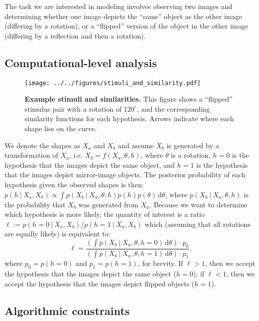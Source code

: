 \documentclass[10pt,letterpaper]{article}
\newcommand{\hi}[0]{h=0}
\newcommand{\hf}[0]{h=1}
\newcommand{\dif}[0]{\,\mathrm{d}}
\begin{document}
The task we are interested in modeling involves observing two images
and determining whether one image depicts the ``same'' object as the
other image (differing by a rotation), or a ``flipped'' version of the
object in the other image (differing by a reflection and then a
rotation).

\subsection{Computational-level analysis}

\begin{figure}[t]
  \begin{center}
    \texttt{[image: ../../figures/stimuli\_and\_similarity.pdf]}
    \caption{\textbf{Example stimuli and similarities.} This figure
      shows a ``flipped'' stimulus pair with a rotation of
      $120^\circ$, and the corresponding similarity functions for each
      hypothesis. Arrows indicate where each shape lies on the curve.}
    \label{fig:shapes}
  \end{center}
\end{figure}

We denote the shapes as $X_a$ and $X_b$ and assume $X_b$ is generated
by a transformation of $X_a$, i.e. $X_b=f(X_a, \theta, h)$, where
$\theta$ is a rotation, $\hi$ is the hypothesis that the images depict
the same object, and $\hf$ is the hypothesis that the images depict
mirror-image objects. The posterior probability of each hypothesis
given the observed shapes is then:
$p(h\ \vert\ X_a, X_b) \propto \int p(X_b\ \vert\ X_a, \theta,
h)p(h)p(\theta)\dif\theta$,
where $p(X_b\ \vert\ X_a, \theta, h)$ is the probability that $X_b$
was generated from $X_a$. Because we want to determine which
hypothesis is more likely, the quantity of interest is a ratio
$\ell:=p(\hi\ \vert\ X_a, X_b) / p(\hf\ \vert\ X_a, X_b)$ which
(assuming that all rotations are equally likely) is equivalent to:
\begin{equation}
  \ell = \frac{\left(\int p(X_b\ \vert\ X_a, \theta, \hi)\dif\theta\right)\cdot{}p_0}{\left(\int p(X_b\ \vert\ X_a, \theta, \hf)\dif\theta\right)\cdot{}p_1},
  \label{eq:lh-ratio}
\end{equation}
where $p_0=p(h=0)$ and $p_1=p(h=1)$, for brevity. If $\ell > 1$, then
we accept the hypothesis that the images depict the same object
($\hi$); if $\ell < 1$, then we accept the hypothesis that the images
depict flipped objects ($\hf$).

\subsection{Algorithmic constraints}
\end{document}
